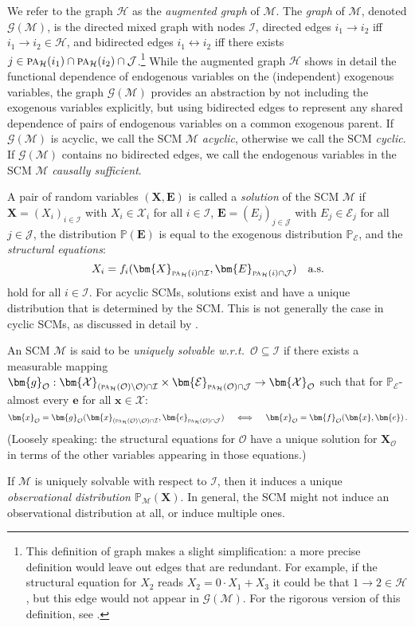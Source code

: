 \documentclass[twoside,11pt]{article}
\newcommand{\Prb}{\mathbb{P}}
\newcommand\B[1]{\bm{#1}}
\newcommand\C[1]{\mathcal{#1}}
\newcommand\BC[1]{\bm{\mathcal{#1}}}
\newcommand\mathbfsc[1]{\text{\normalfont\scshape#1}}
\newcommand\pasub[2]{\mathbfsc{pa}_{#1}(#2)}
\newcommand{\oto}{\leftrightarrow}
\begin{document}
We refer to the graph $\C{H}$ as the \emph{augmented graph} of $\C{M}$.
The \emph{graph} of $\C{M}$, denoted $\C{G}(\C{M})$, is the directed mixed graph
with nodes $\C{I}$, directed edges $i_1 \to i_2$ iff $i_1 \to i_2 \in \C{H}$, and bidirected edges
$i_1 \oto i_2$ iff there exists $j \in \pasub{\C{H}}{i_1} \cap \pasub{\C{H}}{i_2} \cap \C{J}$.\footnote{This
definition of graph makes a slight simplification: 
a more precise definition would leave out edges that are redundant. 
For example, if the structural equation for $X_2$ reads $X_2 = 0 \cdot X_1 + X_3$ it could be that $1 \to 2 \in \C{H}$, 
but this edge would not appear in $\C{G}(\C{M})$.
For the rigorous version of this definition, see \citet{Bongers++_1611.06221v2}.}
While the augmented graph $\C{H}$ shows in detail the functional dependence of endogenous variables
on the (independent) exogenous variables, the graph $\C{G}(\C{M})$ provides an abstraction by not including
the exogenous variables explicitly, but using bidirected edges to represent any shared dependence of
pairs of endogenous variables on a common exogenous parent.
If $\C{G}(\C{M})$ is acyclic, we call the SCM $\C{M}$ \emph{acyclic}, otherwise we call the SCM \emph{cyclic}. 
If $\C{G}(\C{M})$ contains no bidirected edges, we call the endogenous variables in the SCM $\C{M}$ \emph{causally sufficient}.

A pair of random variables $(\B{X},\B{E})$ is called a \emph{solution} of the SCM $\C{M}$ if
$\B{X} = (X_i)_{i \in \C{I}}$ with $X_i \in \C{X}_i$ for all $i \in \C{I}$,
$\B{E} = (E_j)_{j \in \C{J}}$ with $E_j \in \C{E}_j$ for all $j \in \C{J}$,
the distribution $\Prb(\B{E})$ is equal to the exogenous distribution $\Prb_{\BC{E}}$, and
the \emph{structural equations}:
$$X_i = f_i(\B{X}_{\pasub{\C{H}}{i} \cap \C{I}}, \B{E}_{\pasub{\C{H}}{i} \cap \C{J}})\quad\text{a.s.}$$
hold for all $i \in \C{I}$.
For acyclic SCMs, solutions exist and have a unique distribution that is determined by the SCM.
This is not generally the case in cyclic SCMs, as discussed in detail by \citet{Bongers++_1611.06221v2}. 
\begin{definition}\label{def:unique_solvability_wrt}
An SCM $\C{M}$ is said to be \emph{uniquely solvable w.r.t.\ $\C{O} \subseteq \C{I}$} if there exists 
  a measurable mapping $\B{g}_{\C{O}} : \BC{X}_{(\pasub{\C{H}}{\C{O}}\setminus\C{O})\cap\C{I}} \times \BC{E}_{\pasub{\C{H}}{\C{O}} \cap \C{J}} \to \BC{X}_{\C{O}}$ 
such that for $\Prb_{\BC{E}}$-almost every $\B{e}$ for all $\B{x} \in \BC{X}$:
$$
    \B{x}_{\C{O}} = \B{g}_{\C{O}}(\B{x}_{(\pasub{\C{H}}{\C{O}}\setminus\C{O})\cap\C{I}}, \B{e}_{\pasub{\C{H}}{\C{O}}\cap\C{J}}) 
    \quad\iff\quad \B{x}_{\C{O}} = \B{f}_{\C{O}}(\B{x},\B{e}) \,.
$$
(Loosely speaking: the structural equations for $\C{O}$ have a unique solution for $\B{X}_{\C{O}}$ in terms of the other variables appearing in those equations.)
\end{definition}
If $\C{M}$ is uniquely solvable with respect to $\C{I}$, then it induces a unique \emph{observational distribution 
$\Prb_{\C{M}}(\B{X})$}. In general, the SCM might not induce an observational distribution at all, or induce multiple ones.
\end{document}
